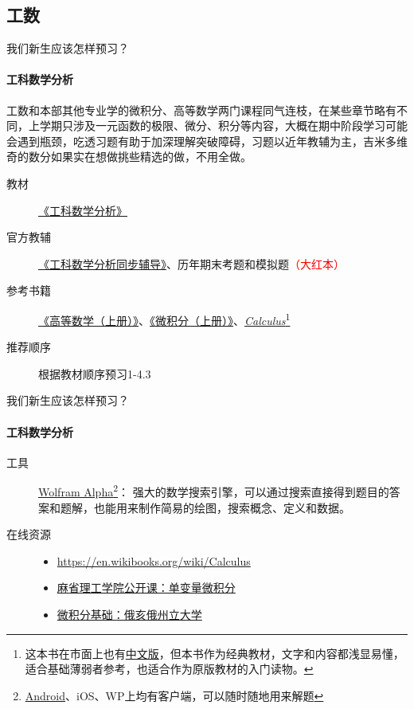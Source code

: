 \documentclass{beamer}
\begin{document}
\subsection{工数}
\begin{frame}{我们新生应该怎样预习？}
\framesubtitle{工科数学分析}
\begin{block}{}
工数和本部其他专业学的微积分、高等数学两门课程同气连枝，在某些章节略有不同，上学期只涉及一元函数的极限、微分、积分等内容，大概在期中阶段学习可能会遇到瓶颈，吃透习题有助于加深理解突破障碍，习题以近年教辅为主，吉米多维奇的数分如果实在想做挑些精选的做，不用全做。
\end{block}
\begin{description}
    \item[教材\faGraduationCap] \href{http://opac.lib.dlut.edu.cn/opac/item.php?marc_no=2008000575}{《工科数学分析》}
    \item[官方教辅\faPencil] \href{http://opac.lib.dlut.edu.cn/opac/item.php?marc_no=2010052839}{《工科数学分析同步辅导》}、历年期末考题和模拟题\textcolor{red}{（大红本）}
    \item[参考书籍\faBook] \href{http://opac.lib.dlut.edu.cn/opac/item.php?marc_no=2007023436}{《高等数学（上册）》}、\href{http://opac.lib.dlut.edu.cn/opac/item.php?marc_no=2009018280}{《微积分（上册）》}、\href{http://www.cengagebrain.com/content/stewart97815_0538497815_01.01_toc.pdf}{\textit{Calculus}}\footnote{这本书在市面上也有\href{http://item.jd.com/10075433.html}{中文版}，但本书作为经典教材，文字和内容都浅显易懂，适合基础薄弱者参考，也适合作为原版教材的入门读物。}
    \item[推荐顺序\faSortNumericAsc] 根据教材顺序预习1-4.3
    
\end{description}
\end{frame}

\begin{frame}{我们新生应该怎样预习？}
\framesubtitle{工科数学分析}
\begin{description}
 \item[工具\faWrench] \href{http://www.wolframalpha.com/}{Wolfram Alpha}\footnote{\href{https://play.google.com/store/apps/details?id=com.wolfram.android.alpha}{Android}、iOS、WP上均有客户端，可以随时随地用来解题}： 强大的数学搜索引擎，可以通过搜索直接得到题目的答案和题解，也能用来制作简易的绘图，搜索概念、定义和数据。
 \item[在线资源\faExternalLink] \begin{itemize}
 \item \faLink\url{https://en.wikibooks.org/wiki/Calculus}
 \item \href{http://open.163.com/special/sp/singlevariablecalculus.html}{麻省理工学院公开课：单变量微积分}
 \item \href{https://www.coursera.org/learn/calculus1}{微积分基础：俄亥俄州立大学} 

 \end{itemize}
\end{description}
\end{frame}
\end{document}
